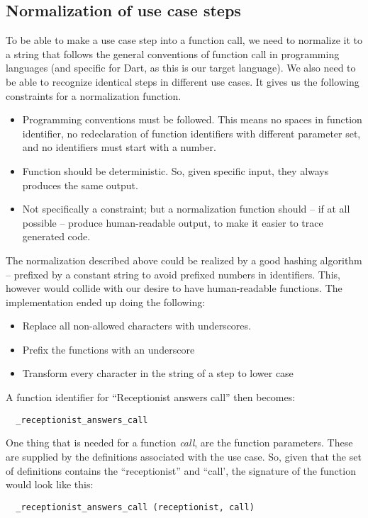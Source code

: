 \subsection{Normalization of use case steps}
To be able to make a use case step into a function call, we need to normalize it to a string that follows the general conventions of function call in programming languages (and specific for Dart, as this is our target language). We also need to be able to recognize identical steps in different use cases. It gives us the following constraints for a normalization function.
\begin{itemize}

  \item Programming conventions must be followed. This means no spaces in function identifier, no redeclaration of function identifiers with different parameter set, and no identifiers must start with a number.
  
  \item Function should be deterministic. So, given specific input, they always produces the same output.
  
  \item Not specifically a constraint; but a normalization function should -- if at all possible -- produce human-readable output, to make it easier to trace generated code.
  
\end{itemize}
The normalization described above could be realized by a good hashing algorithm -- prefixed by a constant string to avoid prefixed numbers in identifiers. This, however would collide with our desire to have human-readable functions. The implementation ended up doing the following:
\begin{itemize}
  \item Replace all non-allowed characters with underscores.
  \item Prefix the functions with an underscore
  \item Transform every character in the string of a step to lower case
\end{itemize}
A function identifier for ``Receptionist answers call'' then becomes:
\begin{verbatim}
  _receptionist_answers_call
\end{verbatim}
One thing that is needed for a function \emph{call}, are the function parameters. These are supplied by the definitions associated with the use case. So, given that the set of definitions contains the ``receptionist'' and ``call', the signature of the function would look like this:
\begin{verbatim}
  _receptionist_answers_call (receptionist, call)
\end{verbatim}


